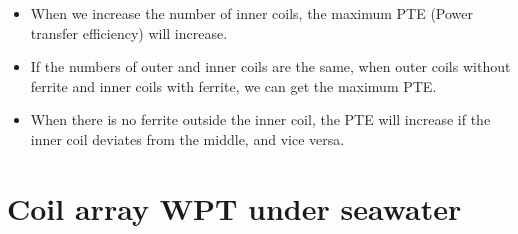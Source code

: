 \begin{itemize}
\item When we increase the number of inner coils, the maximum PTE (Power transfer efficiency) will increase.
\item If the numbers of outer and inner coils are the same, when outer coils without ferrite and inner coils with ferrite, we can get the maximum PTE.
\item When there is no ferrite outside the inner coil, the PTE will increase if the inner coil deviates from the middle, and vice versa.
\end{itemize}


\section{Coil array WPT under seawater}